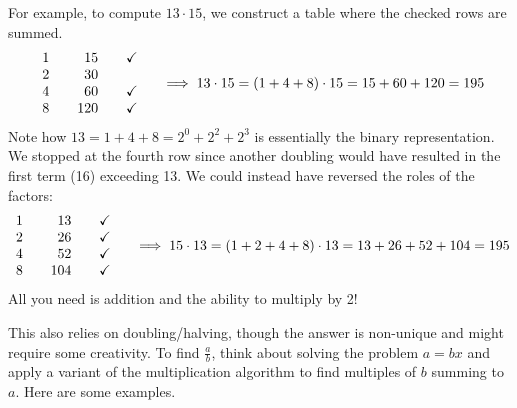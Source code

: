 \goodbreak

For example, to compute $13\cdot 15$, we construct a table where the checked rows are summed.
\[
	\begin{array}{r@{\qquad}r@{\qquad}c}
		1&15&\checkmark\\
		2&30&\\
		4&60&\checkmark\\
		8&120&\checkmark
	\end{array}
	\quad\implies 13\cdot 15=(1+4+8)\cdot 15=15+60+120=195
\]
Note how $13=1+4+8=2^0+2^2+2^3$ is essentially the binary representation. We stopped at the fourth row since another doubling would have resulted in the first term (16) exceeding 13. We could instead have reversed the roles of the factors:
\[
	\begin{array}{r@{\qquad}r@{\qquad}c}
		1&13&\checkmark\\
		2&26&\checkmark\\
		4&52&\checkmark\\
		8&104&\checkmark
	\end{array}
	\quad\implies 15\cdot 13=(1+2+4+8)\cdot 13=13+26+52+104=195
\]
All you need is addition and the ability to multiply by 2!


 This also relies on doubling/halving, though the answer is non-unique and might require some creativity. To find $\frac ab$, think about solving the problem $a=bx$ and apply a variant of the multiplication algorithm to find multiples of $b$ summing to $a$. Here are some examples.


